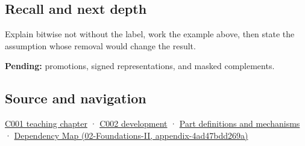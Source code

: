 \subsection{Recall and next depth}\label{appendix-8f38927cfc54-recall-and-next-depth}

Explain bitwise not without the label, work the example above, then state the assumption whose removal would change the result.

\textbf{Pending:} promotions, signed representations, and masked complements.

\subsection{Source and navigation}\label{appendix-8f38927cfc54-source-and-navigation}

\hyperref[01-foundations-i-ch001-from-a-signal-to-an-interpretation]{C001 teaching chapter} · \hyperref[01-foundations-i-ch001-arithmetic-becomes-a-policy]{C002 development} · \hyperref[appendix-fd090d982a15]{Part definitions and mechanisms} · \href{../02-Foundations-II/main.pdf\#nameddest=appendix-4ad47bdd269a}{Dependency Map (02-Foundations-II, appendix-4ad47bdd269a)}
